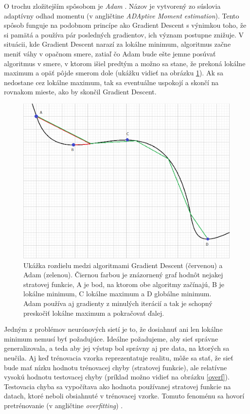 O trochu zložitejším spôsobom je \textit{Adam} \citep{adam}.
Názov je vytvorený zo súslovia adaptívny odhad momentu (v angličtine \textit{ADAptive Moment estimation}).
Tento spôsob funguje na podobnom princípe ako Gradient Descent s výnimkou toho, že si pamätá a používa pár posledných gradientov, ich význam postupne znižuje.
V situácii, kde Gradient Descent narazí za lokálne minimum, algoritmus začne meniť váhy v opačnom smere, zatiaľ čo Adam bude ešte jemne posúvať algoritmus v smere, v ktorom išiel predtým a možno sa stane, že prekoná lokálne maximum a opäť pôjde smerom dole (ukážku vidieť na obrázku \ref{adam}). Ak sa nedostane cez lokálne maximum, tak sa eventuálne uspokojí a skončí na rovnakom mieste, ako by skončil Gradient Descent.
\noindent
\begin{figure} \label{adam}
\includegraphics[width=\textwidth]{../img/gd_adam.png}
\caption{Ukážka rozdielu medzi algoritmami Gradient Descent (červenou) a Adam (zelenou). Čiernou farbou je znázornený graf hodnôt nejakej stratovej funkcie, A je bod, na ktorom obe algoritmy začínajú, B je lokálne minimum, C lokálne maximum a D globálne minimum. Adam používa aj gradienty z minulých iterácií a tak je schopný preskočiť lokálne maximum a pokračovať ďalej.}
\end{figure}

Jedným z problémov neurónových sietí je to, že dosiahnuť ani len lokálne minimum nemusí byť požadujúce.
Ideálne požadujeme, aby sieť správne generalizovala, a teda aby jej výstup bol správny aj pre data, na ktorých sa neučila.
Aj keď trénovacia vzorka reprezentatuje realitu, môže sa stať, že sieť bude mať nízku hodnotu trénovacej chyby (stratovej funkcie), ale relatívne vysokú hodnotu testovacej chyby (príklad možno vidieť na obrázku \ref{overf}). Testovacia chyba sa vypočítava ako hodnota používanej stratovej funkcie na datach, ktoré neboli obsiahnuté v trénovacej vzorke.
Tomuto fenoménu sa hovorí pretrénovanie (v angličtine \textit{overfitting}) \citep{overfit}.

